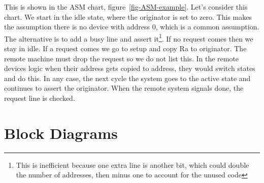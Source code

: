This is shown in the ASM chart, figure~\ref{fig-ASM-example}.  Let's consider this chart.  We start in the idle state, where the originator is set to zero.  This makes the assumption there is no device with address 0, which is a common assumption.  The alternative is to add a busy line and assert it\footnote{This is inefficient because one extra line is another bit, which could double the number of addresses, then minus one to account for the unused code}.  If no request comes then we stay in idle.  If a request comes we go to setup and copy Ra to originator.  The remote machine must drop the request so we do not list this.  In the remote devices logic when their address gets copied to address, they would switch states and do this.  In any case, the next cycle the system goes to the active state and continues to assert the originator.  When the remote system signals done, the request line is checked.

\clearpage

\section{Block Diagrams}





